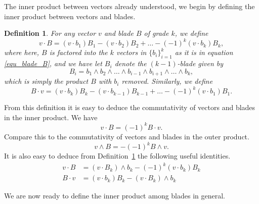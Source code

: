\documentclass[12pt]{article}
\newtheorem{definition}{Definition}[section]
\begin{document}
The inner product between vectors already understood, we begin
by defining the inner product between vectors and blades.

\begin{definition}\label{def_vec_blade_inner_prod}
For any vector $v$ and blade $B$ of grade $k$, we define
\begin{equation}\label{equ_v_dot_B_expanded}
v\cdot B = (v\cdot b_1)B_1 - (v\cdot b_2)B_2 + \dots - (-1)^k(v\cdot b_k)B_k,
\end{equation}
where here, $B$ is factored into the $k$ vectors in $\{b_i\}_{i=1}^k$ as it
is in equation \eqref{equ_blade_B}, and we have let $B_i$ denote the $(k-1)$-blade
given by
\begin{equation}
B_i = b_1\wedge b_2\wedge\dots\wedge b_{i-1}\wedge b_{i+1}\wedge\dots\wedge b_k,
\end{equation}
which is simply the product $B$ with $b_i$ removed.  Similarly, we define
\begin{equation}
B\cdot v = (v\cdot b_k)B_k - (v\cdot b_{k-1})B_{k-1} +\dots - (-1)^k(v\cdot b_1)B_1.
\end{equation}
\end{definition}
From this definition it is easy to deduce the commutativity of vectors and
blades in the inner product.  We have
\begin{equation}
v\cdot B = (-1)^k B\cdot v.
\end{equation}
Compare this to the commutativity of vectors and blades in the outer product.
\begin{equation}
v\wedge B = -(-1)^k B\wedge v.
\end{equation}
It is also easy to deduce from Definition~\ref{def_vec_blade_inner_prod} the
following useful identities.
\begin{align}
v\cdot B &= (v\cdot B_k)\wedge b_k-(-1)^k(v\cdot b_k)B_k \\
B\cdot v &= (v\cdot b_k)B_k - (v\cdot B_k)\wedge b_k
\end{align}

We are now ready to define the inner product among blades
in general.
\end{document}
